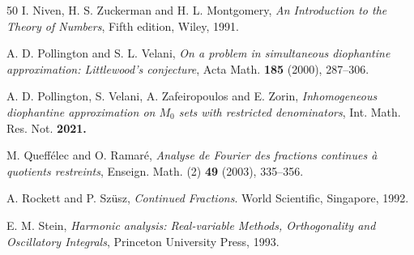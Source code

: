 \documentclass[12pt, reqno]{amsart}
\theoremstyle{definition}
\theoremstyle{remark}
\numberwithin{equation}{section}
\begin{document}
\begin{thebibliography}{50}
I. Niven, H. S. Zuckerman and H. L. Montgomery, \emph{An Introduction to the Theory of Numbers}, Fifth edition, Wiley, 1991.

A. D. Pollington and S. L. Velani, 
{\em On a problem in simultaneous diophantine approximation: Littlewood's conjecture},
Acta Math. \textbf{185} (2000),
287--306.

A. D. Pollington, S. Velani, A. Zafeiropoulos and E. Zorin, \emph{Inhomogeneous diophantine approximation on $M_0$ sets with restricted denominators}, Int. Math. Res. Not. \textbf{2021.}

M. Queff\'elec and O. Ramar\'e, \emph{Analyse de Fourier des fractions continues \`a quotients restreints}, Enseign. Math. (2) \textbf{49} (2003), 335--356.

A. Rockett and P. Sz\"usz, \emph{Continued Fractions}. World Scientific, Singapore, 1992.

E. M. Stein, \emph{Harmonic analysis: Real-variable Methods, Orthogonality and Oscillatory Integrals}, Princeton University Press, 1993.

\end{thebibliography}
\end{document}
